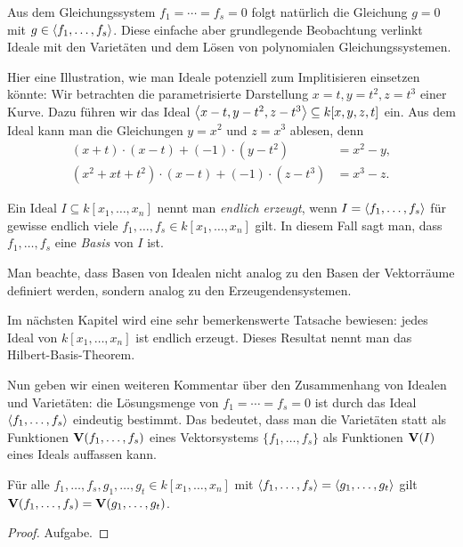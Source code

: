 \documentclass[11pt]{article}
\numberwithin{equation}{section}
\begin{document}
Aus dem Gleichungssystem $f_1 = \cdots = f_s =0$ folgt natürlich die Gleichung $g=0$ mit $g \in \left< f_1,\ldots,f_s \right>$. Diese einfache aber grundlegende  Beobachtung verlinkt Ideale mit den Varietäten und dem Lösen von polynomialen Gleichungssystemen. 

\begin{beispiel}
Hier eine Illustration, wie man Ideale potenziell  zum Implitisieren einsetzen könnte: 
Wir betrachten die parametrisierte Darstellung $x=t, y=t^2, z=t^3$ einer Kurve. Dazu führen wir das Ideal $\left< x-t,y-t^2, z-t^3 \right> \subseteq k[x,y,z,t]$ ein. Aus dem Ideal kann man die Gleichungen $y = x^2$ und $z = x^3$ ablesen, denn
\begin{align*}
	(x+t) \cdot (x-t) + (-1) \cdot (y-t^2) & = x^2 - y,
	\\ (x^2 + x t + t^2) \cdot (x-t) + (-1) \cdot (z - t^3) & = x^3 - z. 
\end{align*}
\end{beispiel}

\begin{definition}
Ein Ideal $I \subseteq k[x_1,\ldots,x_n]$ nennt man \emph{endlich erzeugt}, wenn $I = \left< f_1,\ldots,f_s \right>$ für gewisse endlich viele $f_1,\ldots,f_s \in k[x_1,\ldots,x_n]$ gilt. In diesem Fall sagt man, dass $f_1,\ldots,f_s$ eine \emph{Basis} von $I$ ist. 
\end{definition} 

Man beachte, dass Basen von Idealen nicht analog zu den Basen der Vektorräume definiert werden, sondern analog zu den Erzeugendensystemen. 

Im nächsten Kapitel wird eine sehr bemerkenswerte Tatsache bewiesen: jedes Ideal von $k[x_1,\ldots,x_n]$ ist endlich erzeugt. Dieses Resultat nennt man das Hilbert-Basis-Theorem. 

Nun geben wir einen weiteren Kommentar über den Zusammenhang von Idealen und Varietäten: die Lösungsmenge von $f_1 = \cdots = f_s =0$ ist durch das Ideal $\left< f_1,\ldots,f_s \right>$ eindeutig bestimmt. Das bedeutet, dass man die Varietäten statt als Funktionen $\mathbf{V}(f_1,\ldots,f_s)$ eines Vektorsystems $\{f_1,\ldots,f_s\}$ als Funktionen $\mathbf{V}(I)$ eines Ideals auffassen kann. 

\begin{proposition}
	Für alle  $f_1,\ldots,f_s,g_1,\ldots,g_t \in k[x_1,\ldots,x_n]$ mit $\left< f_1,\ldots,f_s \right> = \left< g_1,\ldots,g_t \right>$ gilt $\mathbf{V}(f_1,\ldots,f_s) = \mathbf{V}(g_1,\ldots,g_t)$. 
\end{proposition} 
\begin{proof}
	Aufgabe. 
\end{proof} 
\end{document}

